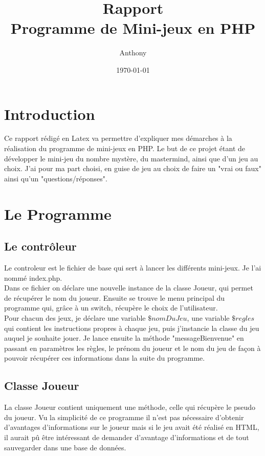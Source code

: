 \documentclass[10pt]{report}
\title{Rapport\\Programme de Mini-jeux en PHP}
\author{Anthony \bsc{ROBIN}}
\date{\today}
\begin{document}
\maketitle
\renewcommand{\contentsname}{Sommaire du rapport}
\tableofcontents

\chapter*{Introduction}
	Ce rapport rédigé en Latex va permettre d'expliquer mes démarches à la réalisation du programme de mini-jeux en PHP.
	Le but de ce projet étant de développer le mini-jeu du nombre mystère, du mastermind, ainsi que d'un jeu au choix. J'ai pour ma part choisi, en guise de jeu au choix de faire un "vrai ou faux" ainsi qu'un "questions/réponses".


\chapter{Le Programme}
	\section{Le contrôleur}
		Le controleur est le fichier de base qui sert à lancer les différents mini-jeux. Je l'ai nommé index.php.\\

		Dans ce fichier on déclare une nouvelle instance de la classe Joueur, qui permet de récupérer le nom du joueur. Ensuite se trouve le menu principal du programme qui, grâce à un switch, récupère le choix de l'utilisateur.\\

		Pour chacun des jeux, je déclare une variable $\$nomDuJeu$, une variable $\$regles$ qui contient les instructions propres à chaque jeu, puis j'instancie la classe du jeu auquel je souhaite jouer. Je lance ensuite la méthode "messageBienvenue" en passant en paramètres les règles, le prénom du joueur et le nom du jeu de façon à pouvoir récupérer ces informations dans la suite du programme.

	\section{Classe Joueur}
		La classe Joueur contient uniquement une méthode, celle qui récupère le pseudo du joueur. Vu la simplicité de ce programme il n'est pas nécessaire d'obtenir d'avantages d'informations sur le joueur mais si le jeu avait été réalisé en HTML, il aurait pû être intéressant de demander d'avantage d'informations et de tout sauvegarder dans une base de données.
\end{document}
